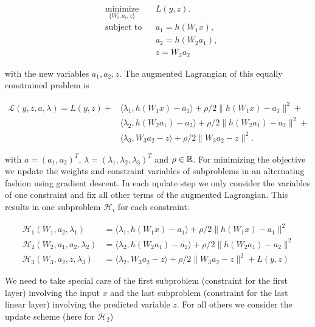 \documentclass[english,11pt,a4paper]{article}
\newcommand\inner[2]{\langle #1, #2 \rangle}
\begin{document}
\begin{equation}
	\begin{aligned}
		& \underset{\{W_i,a_i,z\}}{\text{minimize}}
		&& L(y,z). \\
		& \text{subject to}
		&&  a_1 = h(W_1x), \\
		&&& a_2 = h(W_2a_1), \\
		&&& z = W_3a_2
	\end{aligned}
\end{equation}

with the new variables $a_1, a_2, z$. The augmented Lagrangian of this equally constrained problem is

\begin{equation}
	\begin{aligned}
		\mathcal{L}(y,z,a,\lambda) = L(y,z) + 
		& \inner{\lambda_1}{h(W_1x)-a_1} + \rho/2 \| h(W_1x)-a_1 \|^2 + \\
		& \inner{\lambda_2}{h(W_2a_1)-a_2} + \rho/2 \| h(W_2a_1)-a_2 \|^2 + \\
		& \inner{\lambda_3}{W_3a_2-z} + \rho/2 \| W_3a_2-z \|^2.
	\end{aligned}
\end{equation}

with $a = (a_1,a_2)^T$, $\lambda = (\lambda_1, \lambda_2, \lambda_3)^T$ and $\rho \in \mathbb{R}$. For minimizing the objective we update the weights and constraint variables of subproblems in an alternating fashion using gradient descent. In each update step we only consider the variables of one constraint and fix all other terms of the augmented Lagrangian. This results in one subproblem $\mathcal{H}_i$ for each constraint.

\begin{equation}
	\begin{aligned}
		\mathcal{H}_1(W_1,a_2,\lambda_1) &= \inner{\lambda_1}{h(W_1x)-a_1} + \rho/2 \| h(W_1x)-a_1 \|^2 \\
		\mathcal{H}_2(W_2,a_1,a_2,\lambda_2) &= \inner{\lambda_2}{h(W_2a_1)-a_2} + \rho/2 \| h(W_2a_1)-a_2 \|^2 \\
		\mathcal{H}_3(W_3,a_2,z,\lambda_3) &= \inner{\lambda_2}{W_3a_2-z} + \rho/2 \| W_3a_2-z \|^2 + L(y,z)
	\end{aligned}
\end{equation}

We need to take special care of the first subproblem (constraint for the first layer) involving the input $x$ and the last subproblem (constraint for the last linear layer) involving the predicted variable $z$. For all others we consider the update scheme (here for $\mathcal{H}_2$)
\end{document}
